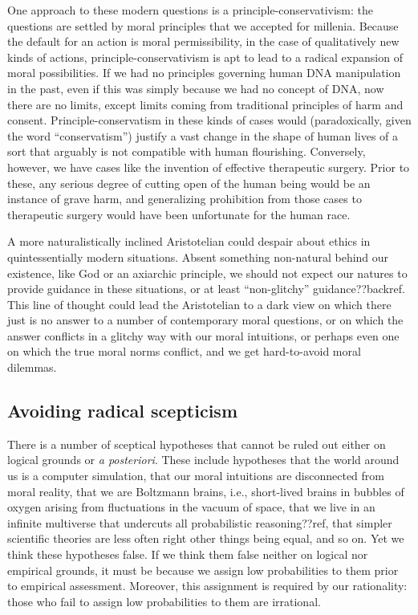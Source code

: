 One approach to these modern questions is a principle-conservativism: the questions are settled by moral principles that we accepted
for millenia. Because the default for an action is moral permissibility, in the case of qualitatively new kinds of actions, 
principle-conservativism is apt to lead to a radical expansion of moral possibilities. If we had no principles governing human DNA
manipulation in the past, even if this was simply because we had no concept of DNA, now there are no limits, except limits coming
from traditional principles of harm and consent. Principle-conservatism in these kinds of cases would (paradoxically, given the word ``conservatism'') justify a vast 
change in the shape of human lives of a sort that arguably is not compatible with human flourishing. Conversely, however, we have 
cases like the invention of effective therapeutic surgery. Prior to these, any serious degree of cutting open of the human 
being would be an instance of grave harm, and generalizing prohibition from
those cases to therapeutic surgery would have been unfortunate for the human race. 

A more naturalistically inclined Aristotelian could despair about ethics in quintessentially modern situations. 
Absent something non-natural behind our existence, like God or an axiarchic principle, we should not expect our natures to provide guidance in these situations, or at least ``non-glitchy''
guidance??backref. This line of thought could lead the Aristotelian to a dark view on which there just is no answer to a number
of contemporary moral questions, or on which the answer conflicts in a glitchy way with our moral intuitions, or perhaps
even one on which the true moral norms conflict, and we get hard-to-avoid moral dilemmas. 

\subsection{Avoiding radical scepticism}
There is a number of sceptical hypotheses that cannot be ruled out either on logical grounds
or \textit{a posteriori}. These include hypotheses that the world around us is a computer simulation, that our moral
intuitions are disconnected from moral reality, that we are Boltzmann brains, i.e., short-lived brains in bubbles of 
oxygen arising from fluctuations in the vacuum of space, that we live in an infinite multiverse that undercuts all
probabilistic reasoning??ref, that simpler scientific theories are less often right other things being equal, and so 
on. Yet we think these hypotheses false. If we think them false neither on logical nor empirical grounds, it must be 
because we assign low probabilities to them prior to empirical assessment. Moreover, this assignment is required by 
our rationality: those who fail to assign low probabilities to them are irrational.

